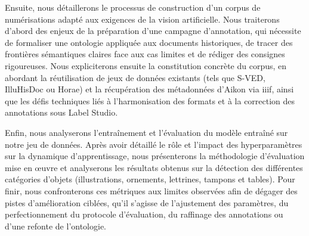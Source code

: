 Ensuite, nous détaillerons le processus de construction d'un corpus de numérisations adapté aux exigences de la vision artificielle. Nous traiterons d'abord des enjeux de la préparation d'une campagne d'annotation, qui nécessite de formaliser une ontologie appliquée aux documents historiques, de tracer des frontières sémantiques claires face aux cas limites et de rédiger des consignes rigoureuses. Nous expliciterons ensuite la constitution concrète du corpus, en abordant la réutilisation de jeux de données existants (tels que S-VED, IlluHisDoc ou Horae) et la récupération des métadonnées d'Aikon via \gls{iiif}, ainsi que les défis techniques liés à l'harmonisation des formats et à la correction des annotations sous Label Studio.

Enfin, nous analyserons l'entraînement et l'évaluation du modèle entraîné sur notre jeu de données. Après avoir détaillé le rôle et l'impact des hyperparamètres sur la dynamique d'apprentissage, nous présenterons la méthodologie d'évaluation mise en œuvre et analyserons les résultats obtenus sur la détection des différentes catégories d'objets (illustrations, ornements, lettrines, tampons et tables). Pour finir, nous confronterons ces métriques aux limites observées afin de dégager des pistes d'amélioration ciblées, qu'il s'agisse de l'ajustement des paramètres, du perfectionnement du protocole d'évaluation, du raffinage des annotations ou d'une refonte de l'ontologie.














